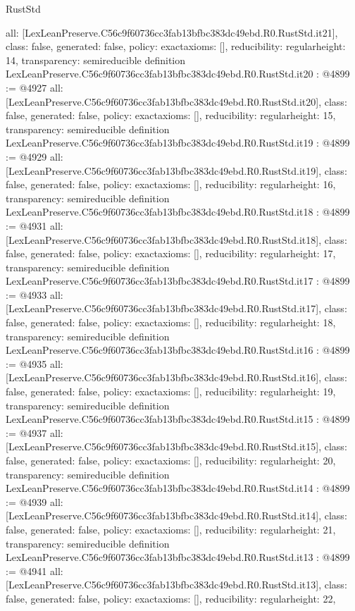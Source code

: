 \begin{lexlean}{RustStd}
\begin{coremodule}
{  all: [LexLeanPreserve.C56c9f60736cc3fab13bfbc383dc49ebd.R0.RustStd.it21],
  class: false,
  generated: false,
  policy: exact{axioms: []},
  reducibility: regular{height: 14},
  transparency: semireducible
}
definition LexLeanPreserve.C56c9f60736cc3fab13bfbc383dc49ebd.R0.RustStd.it20 : @4899 := @4927 {
  all: [LexLeanPreserve.C56c9f60736cc3fab13bfbc383dc49ebd.R0.RustStd.it20],
  class: false,
  generated: false,
  policy: exact{axioms: []},
  reducibility: regular{height: 15},
  transparency: semireducible
}
definition LexLeanPreserve.C56c9f60736cc3fab13bfbc383dc49ebd.R0.RustStd.it19 : @4899 := @4929 {
  all: [LexLeanPreserve.C56c9f60736cc3fab13bfbc383dc49ebd.R0.RustStd.it19],
  class: false,
  generated: false,
  policy: exact{axioms: []},
  reducibility: regular{height: 16},
  transparency: semireducible
}
definition LexLeanPreserve.C56c9f60736cc3fab13bfbc383dc49ebd.R0.RustStd.it18 : @4899 := @4931 {
  all: [LexLeanPreserve.C56c9f60736cc3fab13bfbc383dc49ebd.R0.RustStd.it18],
  class: false,
  generated: false,
  policy: exact{axioms: []},
  reducibility: regular{height: 17},
  transparency: semireducible
}
definition LexLeanPreserve.C56c9f60736cc3fab13bfbc383dc49ebd.R0.RustStd.it17 : @4899 := @4933 {
  all: [LexLeanPreserve.C56c9f60736cc3fab13bfbc383dc49ebd.R0.RustStd.it17],
  class: false,
  generated: false,
  policy: exact{axioms: []},
  reducibility: regular{height: 18},
  transparency: semireducible
}
definition LexLeanPreserve.C56c9f60736cc3fab13bfbc383dc49ebd.R0.RustStd.it16 : @4899 := @4935 {
  all: [LexLeanPreserve.C56c9f60736cc3fab13bfbc383dc49ebd.R0.RustStd.it16],
  class: false,
  generated: false,
  policy: exact{axioms: []},
  reducibility: regular{height: 19},
  transparency: semireducible
}
definition LexLeanPreserve.C56c9f60736cc3fab13bfbc383dc49ebd.R0.RustStd.it15 : @4899 := @4937 {
  all: [LexLeanPreserve.C56c9f60736cc3fab13bfbc383dc49ebd.R0.RustStd.it15],
  class: false,
  generated: false,
  policy: exact{axioms: []},
  reducibility: regular{height: 20},
  transparency: semireducible
}
definition LexLeanPreserve.C56c9f60736cc3fab13bfbc383dc49ebd.R0.RustStd.it14 : @4899 := @4939 {
  all: [LexLeanPreserve.C56c9f60736cc3fab13bfbc383dc49ebd.R0.RustStd.it14],
  class: false,
  generated: false,
  policy: exact{axioms: []},
  reducibility: regular{height: 21},
  transparency: semireducible
}
definition LexLeanPreserve.C56c9f60736cc3fab13bfbc383dc49ebd.R0.RustStd.it13 : @4899 := @4941 {
  all: [LexLeanPreserve.C56c9f60736cc3fab13bfbc383dc49ebd.R0.RustStd.it13],
  class: false,
  generated: false,
  policy: exact{axioms: []},
  reducibility: regular{height: 22},
}
\end{coremodule}
\end{lexlean}
